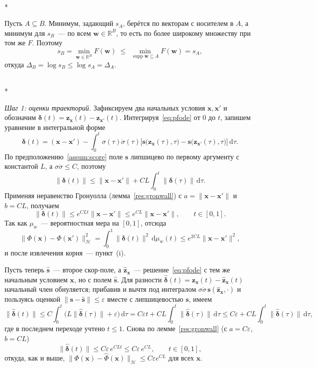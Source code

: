 \documentclass[14pt, a4paper]{extarticle}
\makeatletter
\theoremstyle{definition}
\theoremstyle{plain}
\renewenvironment{proof}[1][\proofname]{\par
    \pushQED{\qed}%
    \normalfont \topsep6\p@\@plus6\p@\relax
    \trivlist
    \item[\hskip\labelsep\itshape #1\@addpunct{.}]\mbox{}\\*
    \ignorespaces
}{\popQED\endtrivlist\@endpefalse}
\makeatother
\begin{document}
\begin{proof}[Доказательство следствия~\ref{cor:submodular}]
Пусть $A\subseteq B$. Минимум, задающий $s_A$, берётся по векторам с носителем в
$A$, а минимум для $s_B$~--- по всем $\mathbf{w}\in\mathbb{R}^{B}$, то есть по более
широкому множеству при том же $F$. Поэтому
\[
    s_B=\min_{\mathbf{w}\in\mathbb{R}^{B}}F(\mathbf{w})
    \;\le\;
    \min_{\operatorname{supp}\mathbf{w}\subseteq A}F(\mathbf{w})=s_A ,
\]
откуда $\Delta_B=\log s_B\le\log s_A=\Delta_A$.
\end{proof}

\begin{proof}[Доказательство утверждения~\ref{prop:lipschitz}]
\emph{Шаг 1: оценки траекторий.} Зафиксируем два начальных условия
$\mathbf{x},\mathbf{x}'$ и обозначим
$\boldsymbol{\delta}(t)=\mathbf{z}_{\mathbf{x}}(t)-\mathbf{z}_{\mathbf{x}'}(t)$.
Интегрируя~\eqref{eq:pfode} от $0$ до $t$, запишем уравнение в интегральной форме
\[
    \boldsymbol{\delta}(t)
    =(\mathbf{x}-\mathbf{x}')
     -\int_0^t\sigma(\tau)\dot\sigma(\tau)
       \big[\mathbf{s}\big(\mathbf{z}_{\mathbf{x}}(\tau),\tau\big)
            -\mathbf{s}\big(\mathbf{z}_{\mathbf{x}'}(\tau),\tau\big)\big]
       \,\mathrm{d}\tau .
\]
По предположению~\ref{assum:score} поле $\mathbf{s}$ липшицево по первому
аргументу с константой $L$, а $\sigma\dot\sigma\le C$, поэтому
\[
    \|\boldsymbol{\delta}(t)\|
    \le\|\mathbf{x}-\mathbf{x}'\|
      +CL\int_0^t\|\boldsymbol{\delta}(\tau)\|\,\mathrm{d}\tau .
\]
Применяя неравенство Гронуолла (лемма~\ref{res:gronwall}) с
$a=\|\mathbf{x}-\mathbf{x}'\|$ и $b=CL$, получаем
\[
    \|\boldsymbol{\delta}(t)\|\le e^{CLt}\|\mathbf{x}-\mathbf{x}'\|
    \le e^{CL}\|\mathbf{x}-\mathbf{x}'\|,\qquad t\in[0,1].
\]
Так как $\mu_w$~--- вероятностная мера на $[0,1]$, отсюда
\[
    \|\Phi(\mathbf{x})-\Phi(\mathbf{x}')\|_{\mathcal{H}}^2
    =\int_0^1\|\boldsymbol{\delta}(t)\|^2\,\mathrm{d}\mu_w(t)
    \le e^{2CL}\|\mathbf{x}-\mathbf{x}'\|^2 ,
\]
и после извлечения корня~--- пункт~(i).

Пусть теперь $\widehat{\mathbf{s}}$~--- второе скор-поле, а
$\widehat{\mathbf{z}}_{\mathbf{x}}$~--- решение~\eqref{eq:pfode} с тем же начальным
условием $\mathbf{x}$, но с полем $\widehat{\mathbf{s}}$. Для разности
$\widehat{\boldsymbol{\delta}}(t)
=\mathbf{z}_{\mathbf{x}}(t)-\widehat{\mathbf{z}}_{\mathbf{x}}(t)$ начальный член
обнуляется; прибавив и вычтя под интегралом
$\sigma\dot\sigma\,\mathbf{s}(\widehat{\mathbf{z}}_{\mathbf{x}},\cdot)$ и
пользуясь оценкой $\|\mathbf{s}-\widehat{\mathbf{s}}\|\le\varepsilon$ вместе с
липшицевостью $\mathbf{s}$, имеем
\[
    \|\widehat{\boldsymbol{\delta}}(t)\|
    \le C\int_0^t\big(L\|\widehat{\boldsymbol{\delta}}(\tau)\|
      +\varepsilon\big)\,\mathrm{d}\tau
    = C\varepsilon t
      +CL\int_0^t\|\widehat{\boldsymbol{\delta}}(\tau)\|\,\mathrm{d}\tau
    \le C\varepsilon
      +CL\int_0^t\|\widehat{\boldsymbol{\delta}}(\tau)\|\,\mathrm{d}\tau ,
\]
где в последнем переходе учтено $t\le1$. Снова по лемме~\ref{res:gronwall} (с
$a=C\varepsilon$, $b=CL$)
\[
    \|\widehat{\boldsymbol{\delta}}(t)\|\le C\varepsilon\,e^{CLt}
    \le C\varepsilon\,e^{CL},\qquad t\in[0,1],
\]
откуда, как и выше,
$\|\Phi(\mathbf{x})-\widehat{\Phi}(\mathbf{x})\|_{\mathcal{H}}\le C\varepsilon e^{CL}$
для всех $\mathbf{x}$.


\end{proof}
\end{document}
